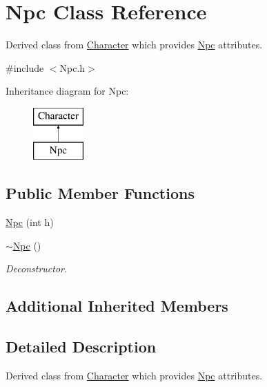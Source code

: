 \hypertarget{classNpc}{\section{Npc Class Reference}
\label{classNpc}
}


Derived class from \hyperlink{classCharacter}{Character} which provides \hyperlink{classNpc}{Npc} attributes.  




{\ttfamily \#include $<$Npc.\-h$>$}

Inheritance diagram for Npc\-:\begin{figure}[H]
\begin{center}
\leavevmode
\includegraphics[height=2.000000cm]{classNpc}
\end{center}
\end{figure}
\subsection*{Public Member Functions}
\begin{DoxyCompactItemize}
\item 
\hyperlink{classNpc_a692a6b5565b561bf0bbfe664bd37fdb7}{Npc} (int h)
\item 
\hypertarget{classNpc_a2249c5155af3d692e51ff610064e81fe}{\hyperlink{classNpc_a2249c5155af3d692e51ff610064e81fe}{$\sim$\-Npc} ()}\label{classNpc_a2249c5155af3d692e51ff610064e81fe}

\begin{DoxyCompactList}\small\item\em Deconstructor. \end{DoxyCompactList}\end{DoxyCompactItemize}
\subsection*{Additional Inherited Members}


\subsection{Detailed Description}
Derived class from \hyperlink{classCharacter}{Character} which provides \hyperlink{classNpc}{Npc} attributes. 

